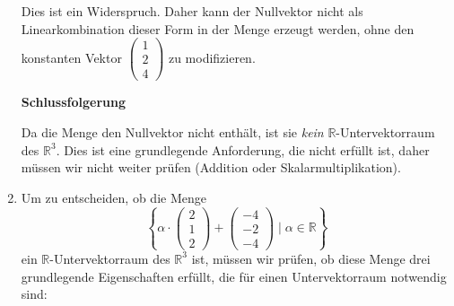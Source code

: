 \documentclass[a4paper]{scrartcl}
\begin{document}
\begin{enumerate}[label=\alph*)]
\[  \]
  Dies ist ein Widerspruch. Daher kann der Nullvektor nicht als Linearkombination dieser Form in der Menge erzeugt werden, ohne den konstanten Vektor \(\begin{pmatrix} 1 \\ 2 \\ 4 \end{pmatrix}\) zu modifizieren.
  
  \textbf{Schlussfolgerung}
  
  Da die Menge den Nullvektor nicht enthält, ist sie \textit{kein} \(\mathbb{R}\)-Untervektorraum des \(\mathbb{R}^3\). Dies ist eine grundlegende Anforderung, die nicht erfüllt ist, daher müssen wir nicht weiter prüfen (Addition oder Skalarmultiplikation).
  
  \newpage

  \item Um zu entscheiden, ob die Menge 
  \[
  \left\{ \alpha \cdot \begin{pmatrix} 2 \\ 1 \\ 2 \end{pmatrix} + \begin{pmatrix} -4 \\-2 \\ -4 \end{pmatrix} \mid \alpha \in \mathbb{R} \right\}
  \]
  ein \(\mathbb{R}\)-Untervektorraum des \(\mathbb{R}^3\) ist, müssen wir prüfen, ob diese Menge drei grundlegende Eigenschaften erfüllt, die für einen Untervektorraum notwendig sind:
  

\end{enumerate}
\end{document}
